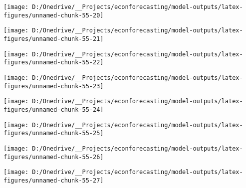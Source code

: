 \documentclass[11pt, letterpaper]{article}\usepackage[]{graphicx}\usepackage[]{color}
\begin{document}
{\centering \texttt{[image: D:/Onedrive/\_\_Projects/econforecasting/model-outputs/latex-figures/unnamed-chunk-55-20]} 

}




{\centering \texttt{[image: D:/Onedrive/\_\_Projects/econforecasting/model-outputs/latex-figures/unnamed-chunk-55-21]} 

}




{\centering \texttt{[image: D:/Onedrive/\_\_Projects/econforecasting/model-outputs/latex-figures/unnamed-chunk-55-22]} 

}




{\centering \texttt{[image: D:/Onedrive/\_\_Projects/econforecasting/model-outputs/latex-figures/unnamed-chunk-55-23]} 

}




{\centering \texttt{[image: D:/Onedrive/\_\_Projects/econforecasting/model-outputs/latex-figures/unnamed-chunk-55-24]} 

}




{\centering \texttt{[image: D:/Onedrive/\_\_Projects/econforecasting/model-outputs/latex-figures/unnamed-chunk-55-25]} 

}




{\centering \texttt{[image: D:/Onedrive/\_\_Projects/econforecasting/model-outputs/latex-figures/unnamed-chunk-55-26]} 

}




{\centering \texttt{[image: D:/Onedrive/\_\_Projects/econforecasting/model-outputs/latex-figures/unnamed-chunk-55-27]} 

}
\end{document}
